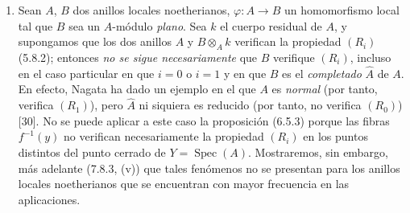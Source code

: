 \begin{remarks}[6.5.5]
\medskip\noindent
\begin{enumerate}
\item[(i)] Sean $A$, $B$ dos anillos locales noetherianos,
$\varphi:A\to B$ un homomorfismo local tal que $B$ sea un $A$-módulo
\emph{plano}. Sea $k$ el cuerpo residual de $A$, y supongamos que los dos anillos
$A$ y $B\otimes_Ak$ verifican la propiedad $(R_i)$ (5.8.2); entonces \emph{no se
sigue necesariamente} que $B$ verifique $(R_i)$, incluso en el caso
particular en que $i=0$ o $i=1$ y en que $B$ es el \emph{completado} $\widehat A$ de
$A$. En efecto, Nagata ha dado un ejemplo en el que $A$ es \emph{normal} (por tanto,
verifica $(R_1)$), pero $\widehat A$ ni siquiera es reducido (por tanto, no
verifica $(R_0)$) [30]. No se puede aplicar a este caso la proposición (6.5.3)
porque las fibras $f^{-1}(y)$ no verifican necesariamente la propiedad
$(R_i)$ en los puntos distintos del punto cerrado de
$Y=\operatorname{Spec}(A)$. Mostraremos, sin embargo, más adelante (7.8.3,
(v)) que tales fenómenos no se presentan para los anillos locales
noetherianos que se encuentran con mayor frecuencia en las aplicaciones.


\end{enumerate}
\end{remarks}
